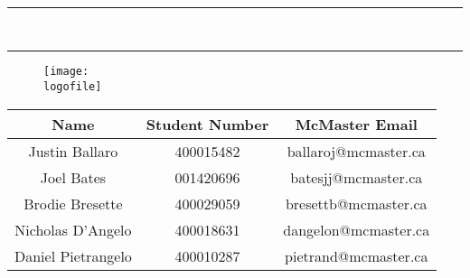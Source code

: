 \begin{titlepage}

\newcommand{\HRule}{\rule{\linewidth}{0.5mm}}

\center

\textsc{\LARGE \org}\\[1.5cm] %
\textsc{\Large \headingmajor}\\[0.5cm] %
\textsc{\large \headingminor}\\[0.5cm] %

\vspace{1cm}
\HRule \\[0.2cm]
{ \Large \vspace{0.25cm}  \textsc{  \LARGE \doctitle} \vspace{0.3cm} }  %
\HRule \vspace{.5cm}
\textsc{\LARGE \projtitle} %
\vspace{1cm}
 \begin{figure}[h]
  \centering
  \texttt{[image: \\logofile]}
\end{figure}
 \vspace{1cm}
 
\begin{table}[ht!] \centering
\begin{tabular}{c c c}
\toprule
\textbf{Name} & \textbf{Student Number} & \textbf{McMaster Email} \\ 
\midrule
Justin Ballaro & 400015482 & ballaroj@mcmaster.ca \\
Joel Bates & 001420696 & batesjj@mcmaster.ca \\
Brodie Bresette & 400029059 & bresettb@mcmaster.ca \\
Nicholas D'Angelo & 400018631 &  dangelon@mcmaster.ca  \\
Daniel Pietrangelo & 400010287 &  pietrand@mcmaster.ca \\
\bottomrule
\end{tabular}
\label{Tab:HU}
\end{table}

\end{titlepage}
